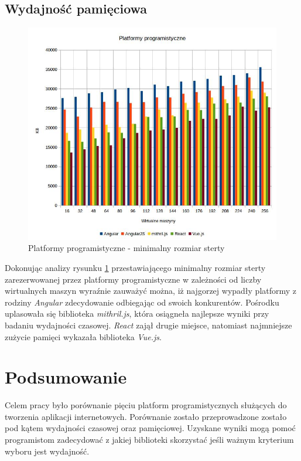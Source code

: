 \documentclass[polish, twoside, 12pt]{mwart}
\let\stdsection\section
\renewcommand*{\section}{\clearpage\stdsection}
\begin{document}
\subsection{Wydajność pamięciowa}

\begin{figure}[ht]
  \includegraphics[width=\textwidth]{frameworks-heap.jpg}
  \caption{Platformy programistyczne - minimalny rozmiar sterty}
  \label{fig:frameworks-heap}
\end{figure}

Dokonując analizy rysunku \ref{fig:frameworks-heap} przestawiającego minimalny rozmiar sterty zarezerwowanej przez platformy programistyczne w zależności od liczby wirtualnych maszyn wyraźnie zauważyć można, iż najgorzej wypadły platformy z rodziny \emph{Angular} zdecydowanie odbiegając od swoich konkurentów. Pośrodku uplasowała się biblioteka \emph{mithril.js}, która osiągneła najlepsze wyniki przy badaniu wydajności czasowej. \emph{React} zajął drugie miejsce, natomiast najmniejsze zużycie pamięci wykazała biblioteka \emph{Vue.js}.

\section{Podsumowanie}

Celem pracy było porównanie pięciu platform programistycznych służących do tworzenia aplikacji internetowych. Porównanie zostało przeprowadzone zostało pod kątem wydajności czasowej oraz pamięciowej. Uzyskane wyniki mogą pomoć programistom zadecydować z jakiej biblioteki skorzystać jeśli ważnym kryterium wyboru jest wydajność.
\end{document}
